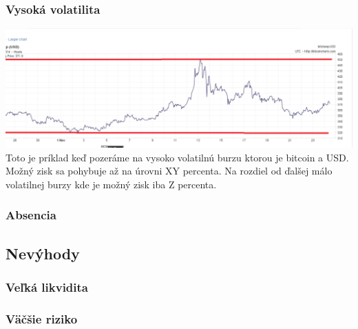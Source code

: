 \subsubsection{Vysoká volatilita}
\includegraphics[width=1\textwidth]{obr}
Toto je príklad keď pozeráme na vysoko volatilnú burzu ktorou je bitcoin a USD. Možný zisk sa pohybuje až na úrovni XY percenta. Na rozdiel od ďalšej málo volatilnej burzy kde je  možný zisk iba Z percenta.
\subsubsection{Absencia }
\subsection{Nevýhody}
\subsubsection{Veľká likvidita}
\subsubsection{Väčšie riziko}
